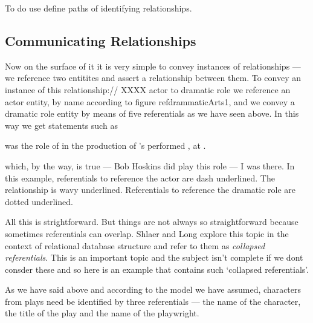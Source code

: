 To do use define paths of identifying relationships.

\subsection{Communicating Relationships}
\mynote 
Now on the surface of it it is very simple
to convey instances of relationships --- we reference two entitites and assert a relationship between them. 
To convey an instance of this relationship://
XXXX actor to dramatic role
we reference an actor entity, by name according to figure ref{drammaticArts1},
and we convey a dramatic role entity by means of five referentials as we have seen above.
In this way we get statements such as
\begin{erquote}

\parbox{9.0cm}{\linespread{1.5}\normalsize{} was  the role of  in the production of \mbox{'s}  performed \mbox{,} at .
}
\end{erquote}
which, by the way, is true  --- Bob Hoskins did play this role --- I was there.
In this example, referentials to reference the actor are dash underlined. The relationship is wavy underlined.
Referentials to reference the dramatic role are dotted underlined.

All this is strightforward. But things are not always so straightforward because sometimes referentials can overlap. 
Shlaer and Long explore this topic in the context of relational database structure and refer to them as \textit{collapsed referentials}. This is an important topic and the subject isn't complete if we dont 
consder these and so here is an example that contains such `collapsed referentials'.

As we have said above and according to the model we have assumed,
  characters from plays need be identified by three referentials
 --- the name of the character, the title of the play and the name of the playwright.

